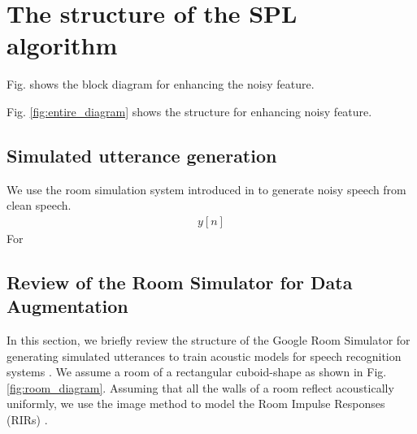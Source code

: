 \documentclass{article}
\begin{document}
\section{The structure of the SPL algorithm}

Fig. \label{fig:entire_diagram} shows the block diagram for
enhancing the noisy feature.


Fig. \ref{fig:entire_diagram} shows the structure for enhancing
noisy feature.

\subsection{Simulated utterance generation}
We use the room simulation system introduced in
\cite{C_Kim_INTERSPEECH_2017_1} to generate noisy speech
from clean speech.
\begin{align}
  y[n]
\end{align}
For 
\subsection{Review of the Room Simulator for Data Augmentation}
%
%
%
%
In this section, we briefly review the structure of the Google
Room Simulator for generating simulated utterances
to train acoustic models for speech recognition systems
\cite{C_Kim_INTERSPEECH_2017_1}. We assume a room of a
rectangular cuboid-shape as shown in Fig. \ref{fig:room_diagram}.
Assuming that all the walls of a room reflect acoustically uniformly,
we use the image method to model the Room Impulse Responses (RIRs)
\cite{J_Allen_JASA_1979, E_A_Lehmann_ASPAA_2007, S_G_McGovern_RIR}.
\end{document}
